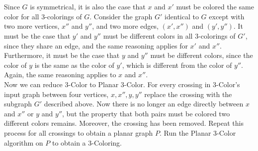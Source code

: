 \documentclass[letterpaper,notitlepage,twoside]{article}
\begin{document}
\\\\
Since $G$ is symmetrical, it is also the case that $x$ and $x'$ must be colored the same color for all 3-colorings of $G$. Consider the graph $G'$ identical to $G$ except with two more vertices, $x''$ and $y''$, and two more edges, $(x', x'')$ and $(y', y'')$. It must be the case that $y'$ and $y''$ must be different colors in all 3-colorings of $G'$, since they share an edge, and the same reasoning applies for $x'$ and $x''$. Furthermore, it must be the case that $y$ and $y''$ must be different colors, since the color of $y$ is the same as the color of $y'$, which is different from the color of $y''$. Again, the same reasoning applies to $x$ and $x''$.
\\
Now we can reduce 3-Color to Planar 3-Color. For every crossing in 3-Color's input graph between four vertices, $x, x'', y, y''$ replace the crossing with the subgraph $G'$ described above. Now there is no longer an edge directly between $x$ and $x''$ or $y$ and $y''$, but the property that both pairs must be colored two different colors remains. Moreover, the crossing has been removed. Repeat this process for all crossings to obtain a planar graph $P$. Run the Planar 3-Color algorithm on $P$ to obtain a 3-Coloring.
\end{document}
